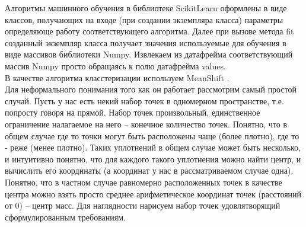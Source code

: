 \documentclass[11pt]{article}
\begin{document}
    Алгоритмы машинного обучения в библиотеке ScikitLearn оформлены в виде
классов, получающих на входе (при создании экземпляра класса) параметры
определяюще работу соответствующего алгоритма. Далее при вызове метода
fit созданный экземпляр класса получает значения используемые для
обучения в виде массивов библиотеки Numpy. Извлекаем из датафрейма
соответствующий массив Numpy просто обращаясь к полю датафрейма values.
\\ В качестве алгоритма класстеризации используем MeanShift
\cite{litlink2} \cite{litlink5}. \\ Для неформального
понимания того как он работает рассмотрим самый простой случай. Пусть у
нас есть некий набор точек в одномерном пространстве, т.е. попросту
говоря на прямой. Набор точек произвольный, единственное ограничение
налагаемое на него -- конечное количество точек. Понятно, что в общем
случае где то точки могут быть расположены чаще (более плотно), где то -
реже (менее плотно). Таких уплотнений в общем случае может быть
несколько, и интуитивно понятно, что для каждого такого уплотнения можно
найти центр, и вычислить его координаты (а координат у нас в
рассматриваемом случае одна). Понятно, что в частном случае равномерно
расположенных точек в качестве центра можно взять просто среднее
арифметическое координат точек (расстояний от 0) -- центр масс. Для
наглядности нарисуем набор точек удовлятворящий сформулированным
требованиям.

    \begin{center}
    \end{center}
    { \hspace*{\fill} \\}
    
\end{document}
